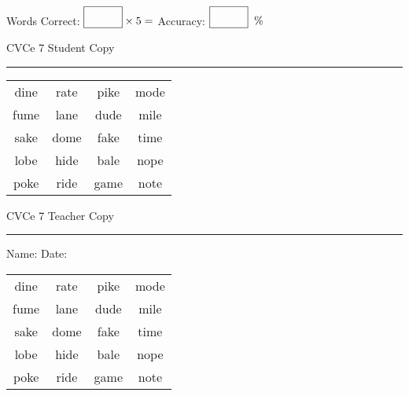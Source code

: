 \documentclass{memoir}
\begin{document}
\small

Words Correct: $\fbox{\phantom{\huge 100}} \times 5 = $ Accuracy: $\fbox{\phantom{\huge 100}}\;\; \%$ 

\vfill

\newpage


\footnotesize \noindent
CVCe 7 \hfill Student Copy
\smallskip
\hrule

\Large

\setlength{\tabcolsep}{14pt}
\def\arraystretch{2}

{\selectfont


\begin{vplace}[0.5]
\begin{center}
\begin{tabular}{cccc}
dine & rate & pike & mode \\
fume & lane & dude & mile \\
sake & dome & fake & time \\
lobe & hide & bale & nope \\
poke & ride & game & note \\
\end{tabular}
\end{center}
\end{vplace}

}

\newpage

\footnotesize \noindent
CVCe 7 \hfill Teacher Copy
\smallskip
\hrule

\small

\vfill

\noindent
Name: \underline{\hspace{1.75in}} \hfill Date: \underline{\hspace{1in}}

\Large

{\selectfont


\begin{vplace}[0.5]
\begin{center}
\begin{tabular}{cccc}
dine & rate & pike & mode \\
fume & lane & dude & mile \\
sake & dome & fake & time \\
lobe & hide & bale & nope \\
poke & ride & game & note \\
\end{tabular}
\end{center}
\end{vplace}



}
\end{document}
